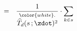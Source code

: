 \begin{enumerate}
\begin{eqnarray*}
    \\
    & = &
        \dfrac{1}{
            \overset{{\color{white}.}}{
                \widehat{T}_{d}(s\,;\zdot)^{2}
                }
            }
        \cdot
        \underset{k \in s}{\sum}\,

\end{eqnarray*}
\end{enumerate}
